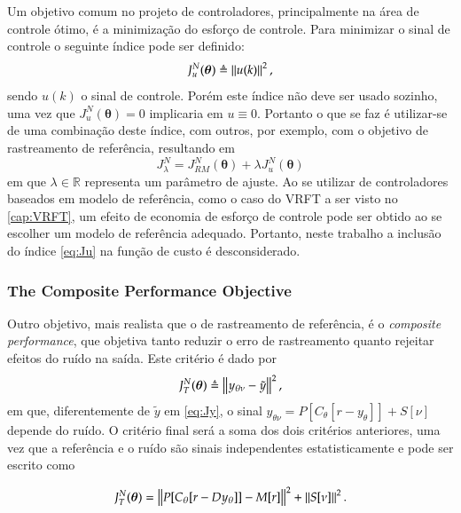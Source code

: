 Um objetivo comum no projeto de controladores, principalmente na área de controle ótimo, é a minimização do esforço de controle. Para minimizar o sinal de controle o seguinte índice pode ser definido:
\begin{equation}
   J_u^N(\bm{\theta}) \triangleq \left\lVert u(k) \right\rVert^{2},
   \label{eq:Ju}
\end{equation}
sendo $u(k)$ o sinal de controle. Porém este índice não deve ser usado sozinho, uma vez que $J_u^N(\bm{\theta}) = 0$ implicaria em $u \equiv 0$. Portanto o que se faz é utilizar-se de uma combinação deste índice, com outros, por exemplo, com o objetivo de rastreamento de referência, resultando em 
\begin{equation}
   J_\lambda^N = J_{RM}^N(\bm{\theta}) + \lambda J_u^N(\bm{\theta})
   \label{eq:Jl}
\end{equation}
em que $\lambda \in \mathbb{R}$ representa um parâmetro de ajuste.
Ao se utilizar de controladores baseados em modelo de referência, como o caso do VRFT a ser visto no \ref{cap:VRFT}, um efeito de economia de esforço de controle pode ser obtido ao se escolher um modelo de referência adequado. Portanto, neste trabalho a inclusão do índice \eqref{eq:Ju} na função de custo é desconsiderado.



\subsubsection{The Composite Performance Objective}%
\label{sub:the_composite_performance_objective}

Outro objetivo, mais realista que o de rastreamento de referência, é o \textit{composite performance}, que objetiva tanto reduzir o erro de rastreamento quanto rejeitar efeitos do ruído na saída. Este critério é dado por
\begin{equation}
   J_T^N(\bm{\theta}) \triangleq \left\lVert y_{\theta\nu} - \tilde{y} \right\rVert^2,
   \label{eq:JT}
\end{equation}
em que, diferentemente de $\tilde{y}$ em \eqref{eq:Jy}, o sinal $y_{\theta\nu}= P[C_\theta[r-y_\theta]] + S[\nu]$ depende do ruído. O critério final será a soma dos dois critérios anteriores, uma vez que a referência e o ruído são sinais independentes estatisticamente e pode ser escrito como

\begin{equation}
   J_T^N(\bm{\theta}) = \left\lVert P[C_\theta[r-Dy_\theta]] - M[r] \right\rVert^{2} + \left\lVert S[\nu] \right\rVert^2.
   \label{eq:}
\end{equation}







